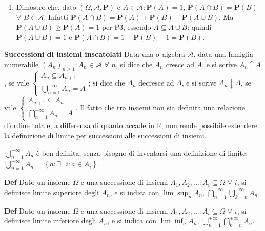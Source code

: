 \documentclass{article}
\begin{document}
\begin{enumerate}
\item Dimostro che, dato $\left( \Omega ,\mathcal{A},\mathbf{P}\right) $ e $%
A\in \mathcal{A}:\mathbf{P}\left( A\right) =1$, $\mathbf{P}\left( A\cap
B\right) =\mathbf{P}\left( B\right) $ $\forall $ $B\in \mathcal{A}$. Infatti 
$\mathbf{P}\left( A\cap B\right) =\mathbf{P}\left( A\right) +\mathbf{P}%
\left( B\right) -\mathbf{P}\left( A\cup B\right) $. Ma $\mathbf{P}\left(
A\cup B\right) \mathbf{\geq P}\left( A\right) =1$ per P3, essendo $%
A\subseteq A\cup B$: quindi $\mathbf{P}\left( A\cup B\right) =1$ e $\mathbf{P%
}\left( A\cap B\right) =1+\mathbf{P}\left( B\right) -1=\mathbf{P}\left(
B\right) $.
\end{enumerate}

\textbf{Successioni di insiemi inscatolati }Data una $\sigma $-algebra $%
\mathcal{A}$, data una famiglia numerabile $\left( A_{n}\right) _{n\geq
1}:A_{n}\in \mathcal{A}$ $\forall $ $n$, si dice che $A_{n}$ cresce ad $A$,
e si scrive $A_{n}\uparrow A$, se vale $\left\{ 
\begin{array}{c}
A_{n}\subseteq A_{n+1} \\ 
\bigcup_{n=1}^{+\infty }A_{n}=A%
\end{array}%
\right. $; si dice che $A_{n}$ decresce ad $A$, e si scrive $A_{n}\downarrow
A$, se vale $\left\{ 
\begin{array}{c}
A_{n+1}\subseteq A_{n} \\ 
\bigcap_{n=1}^{+\infty }A_{n}=A%
\end{array}%
\right. $. Il fatto che tra insiemi non sia definita una relazione d'ordine
totale, a differenza di quanto accade in $%
\mathbb{R}
$, non rende possibile estendere la definizione di limite per successioni
alle successioni di insiemi.

$\bigcup_{n=1}^{+\infty }A_{n}$ \`{e} ben definita, senza bisogno di
inventarsi una definizione di limite: $\bigcup_{n=1}^{+\infty }A_{n}=\left\{
a:\exists \text{ }i:a\in A_{i}\right\} $.

\textbf{Def} Dato un insieme $\Omega $ e una successione di insiemi $%
A_{1},A_{2},...:A_{i}\subseteq \Omega $ $\forall $ $i$, si definisce limite
superiore degli $A_{n}$, e si indica con $\lim \sup_{n}A_{n}$, $%
\bigcap_{n=1}^{+\infty }\bigcup_{k=n}^{+\infty }A_{n}$.

\textbf{Def} Dato un insieme $\Omega $ e una successione di insiemi $%
A_{1},A_{2},...:A_{i}\subseteq \Omega $ $\forall $ $i$, si definisce limite
inferiore degli $A_{n}$, e si indica con $\lim \inf_{n}A_{n}$, $%
\bigcup_{n=1}^{+\infty }\bigcap_{k=n}^{+\infty }A_{n}$.
\end{document}
